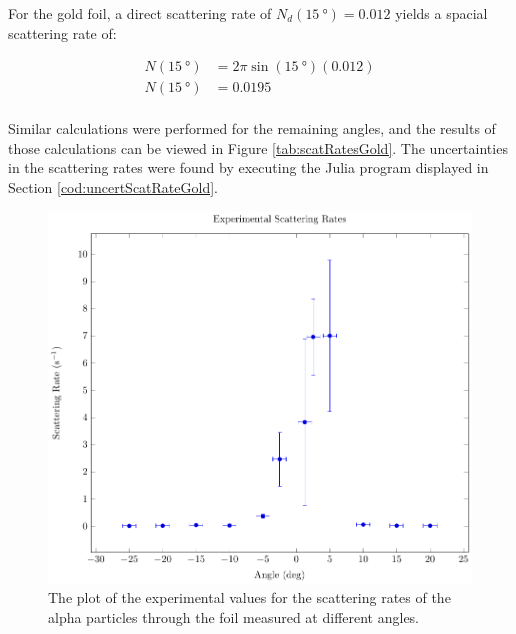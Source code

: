 \documentclass[a4paper]{article}
\begin{document}
\qq For the gold foil, a direct scattering rate of \( N_d (\SI{15}{\degree}) =
\num{0.012} \) yields a spacial scattering rate of:

\begin{align*}
  N (\SI{15}{\degree}) &= 2 \pi \sin{(\SI{15}{\degree})} (\num{0.012}) \\
  N (\SI{15}{\degree}) &= \num{0.0195} \\
\end{align*}

Similar calculations were performed for the remaining angles, and the results of
those calculations can be viewed in Figure \ref{tab:scatRatesGold}. The
uncertainties in the scattering rates were found by executing the Julia program
displayed in Section \ref{cod:uncertScatRateGold}.

\begin{figure}[H]
  \begin{center}
    \includegraphics[scale=0.8]{Plots/ExperimentalScatteringRates/expScatRates.pdf}
  \end{center}
  \caption{The plot of the experimental values for the scattering rates of the
    alpha particles through the foil measured at different angles.}
  \label{gph:expScatRatesGold}
\end{figure}

\qq
\end{document}

